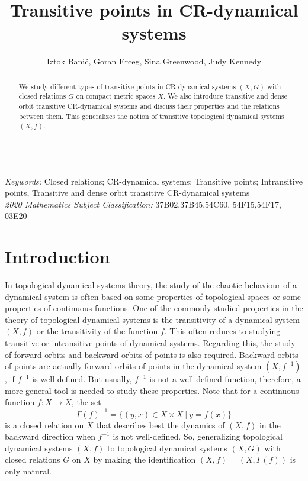 \documentclass[a4paper,12pt]{article} %
\begin{document}
\def\joinrel{\mkern-3mu}
\newcommand{\varproj}{\displaystyle \lim_{\multimapinv\joinrel-\joinrel-}}


\title{Transitive  points in CR-dynamical systems}
\author{Iztok Bani\v c, Goran Erceg, Sina Greenwood, Judy Kennedy}
\date{}

\maketitle

\begin{abstract}
\noindent We study different types of transitive points in CR-dynamical systems $(X,G)$ with closed relations   $G$ on compact metric spaces $X$.  We also introduce transitive and dense orbit transitive CR-dynamical systems  and discuss  their properties and the relations between them.  This generalizes the notion of transitive topological dynamical systems $(X,f)$.
\end{abstract}
\-
\\
\noindent
{\it Keywords:} Closed relations; CR-dynamical systems; Transitive points; In\-tran\-sitive points, Transitive and dense orbit transitive CR-dynamical systems \\
\noindent
{\it 2020 Mathematics Subject Classification:} 37B02,37B45,54C60, 54F15,54F17, 03E20



\section{Introduction}\label{s000}


In topological dynamical systems theory,  the study of the chaotic behaviour of a dynamical system is  often based on some  properties of topological spaces or some properties of continuous functions.  One of the commonly studied properties in the theory of topological dynamical systems is the transitivity of a dynamical system $(X,f)$ or the transitivity of the function $f$.  This often reduces to studying transitive or intransitive points of dynamical systems.  Regarding this, the study of forward orbits and backward orbits of points is also required.  Backward orbits of points are actually forward orbits of points in the dynamical system $(X,f^{-1})$, if $f^{-1}$ is well-defined.  But usually, $f^{-1}$ is not a well-defined function, therefore, a more general tool is needed to study these properties. Note that for a continuous function $f:X\rightarrow X$,  the set
$$
\Gamma(f)^{-1}=\{(y,x) \in X\times X \ | \  y=f(x)\}
$$  
is a closed relation on $X$ that describes best the dynamics of $(X,f)$ in the backward direction  when $f^{-1}$ is not well-defined.  So,  generalizing topological dynamical systems $(X,f)$ to topological dynamical systems $(X,G)$ with closed relations $G$ on $X$ by making the identification $(X,f)=(X,\Gamma(f))$ is only  natural.  
\end{document}
